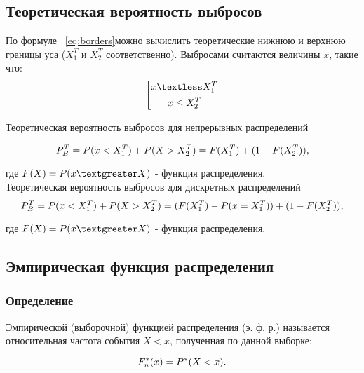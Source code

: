 \documentclass[12pt,a4paper]{scrartcl}
\begin{document}
\subsection{Теоретическая вероятность выбросов}

По формуле ~\eqref{eq:borders}можно вычислить теоретические нижнюю и верхнюю границы уса
($X_1^T$ и $X_2^T$ соответственно).
Выбросами считаются величины $x$, такие что:
\begin{equation}\label{eq:emissions}
\centering
\left[ 
      \begin{gathered} 
       x \textless X_1^T \\
	  x \leq X_2^T \\
      \end{gathered} 
\right.
\end{equation}

Теоретическая вероятность выбросов для непрерывных распределений

\begin{equation}\label{eq:prob1}
\centering
P_B^T = P(x < X_1^T) + P(X > X_2^T) = F(X_1^T) + (1 - F(X_2^T)),
\end{equation}

где $F(X) = P(x\textgreater X) $ - функция распределения. \\

Теоретическая вероятность выбросов для дискретных распределений
\begin{equation}\label{eq:prob2}
\centering
P_B^T = P(x < X_1^T) + P(X > X_2^T) = (F(X_1^T) - P(x = X_1^T)) + (1 - F(X_2^T)),
\end{equation}

где $F(X) = P(x\textgreater X) $ - функция распределения.

\subsection{Эмпирическая функция распределения}
\subsubsection{Определение}

Эмпирической (выборочной) функцией распределения (э. ф. р.) называется
относительная частота события $X < x$, полученная по данной выборке:

\begin{equation}\label{eq:EmpDistr}
\centering
F_n^*(x) = P^*(X < x).
\end{equation}
\end{document}
